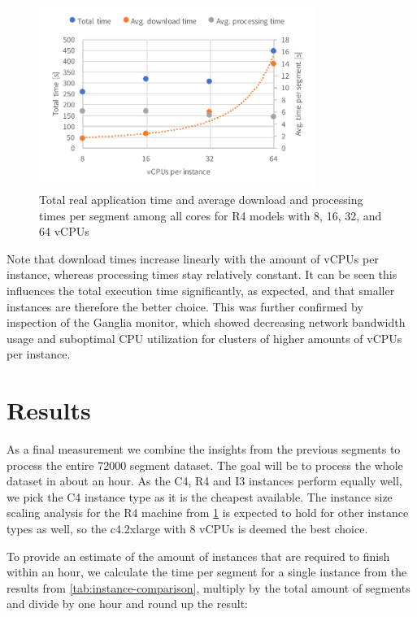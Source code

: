 \documentclass{article}
\begin{document}
\begin{figure}[H]
	\centering
	\includegraphics[width=0.8\textwidth]{resource/r4-scaling.pdf}
	\caption{Total real application time and average download and processing times per segment among all cores for R4 models with 8, 16, 32, and 64 vCPUs}
	\label{fig:r4-scaling}
\end{figure}

Note that download times increase linearly with the amount of vCPUs per instance, whereas processing times stay relatively constant.
It can be seen this influences the total execution time significantly, as expected, and that smaller instances are therefore the better choice.
This was further confirmed by inspection of the Ganglia monitor, which showed decreasing network bandwidth usage and suboptimal CPU utilization for clusters of higher amounts of vCPUs per instance.

\section{Results}
As a final measurement we combine the insights from the previous segments to process the entire \num{72000} segment dataset.
The goal will be to process the whole dataset in about an hour.
As the C4, R4 and I3 instances perform equally well, we pick the C4 instance type as it is the cheapest available.
The instance size scaling analysis for the R4 machine from \cref{fig:r4-scaling} is expected to hold for other instance types as well, so the c4.2xlarge with 8 vCPUs is deemed the best choice.

To provide an estimate of the amount of instances that are required to finish within an hour, we calculate the time per segment for a single instance from the results from \cref{tab:instance-comparison}, multiply by the total amount of segments and divide by one hour and round up the result:
\end{document}
